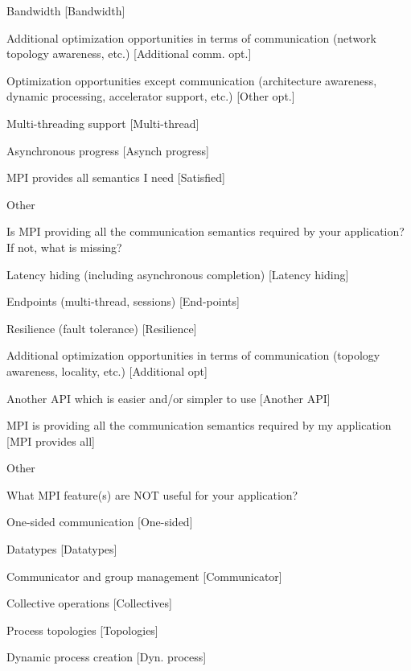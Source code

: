 \documentclass[preprint,5p,times]{elsarticle}
\begin{document}
{{\begin{description}
\begin{inparaenum}[{\bf C}1)]
    \item Bandwidth [Bandwidth]
    \item Additional optimization opportunities in terms of communication
      (network topology awareness, etc.) [Additional comm. opt.]
    \item Optimization opportunities except communication (architecture
      awareness, dynamic processing, accelerator support, etc.) [Other opt.]
    \item Multi-threading support [Multi-thread]
    \item Asynchronous progress [Asynch progress]
    \item MPI provides all semantics I need [Satisfied]
    \item Other
    \end{inparaenum}
  \item[Q26*:] Is MPI providing all the communication semantics required
    by your application? If not, what is missing?
    \begin{inparaenum}[{\bf C}1)]
    \item Latency hiding (including asynchronous completion) [Latency hiding]
    \item Endpoints (multi-thread, sessions) [End-points]
    \item Resilience (fault tolerance) [Resilience]
    \item Additional optimization opportunities in terms of communication
      (topology awareness, locality, etc.) [Additional opt]
    \item Another API which is easier and/or simpler to use [Another API]
    \item MPI is providing all the communication semantics required by my
      application [MPI provides all]
    \item Other
    \end{inparaenum}
  \item[Q27*:] What MPI feature(s) are NOT useful for your application?
    \begin{inparaenum}[{\bf C}1)]
    \item One-sided communication [One-sided]
    \item Datatypes [Datatypes]
    \item Communicator and group management [Communicator]
    \item Collective operations [Collectives]
    \item Process topologies [Topologies]
    \item Dynamic process creation [Dyn. process]

\end{inparaenum}
\end{description}}}
\end{document}
